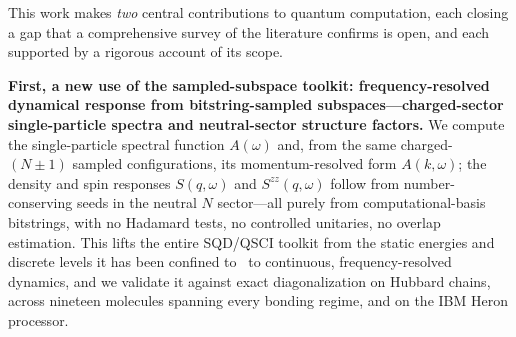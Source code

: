 This work makes \emph{two} central contributions to quantum computation, each closing a gap that a
comprehensive survey of the literature confirms is open, and each supported by a rigorous account of
its scope.

\textbf{First, a new use of the sampled-subspace toolkit: frequency-resolved dynamical response
from bitstring-sampled subspaces---charged-sector single-particle spectra and neutral-sector structure factors.} We compute the single-particle spectral function $A(\omega)$ and, from the same
charged-$(N{\pm}1)$ sampled configurations, its momentum-resolved form $A(k,\omega)$; the density and
spin responses $S(q,\omega)$ and $S^{zz}(q,\omega)$ follow from number-conserving seeds in the neutral
$N$ sector---all purely from computational-basis bitstrings, with no Hadamard tests, no controlled unitaries, no
overlap estimation. This lifts the entire SQD/QSCI toolkit from the static energies and discrete
levels it has been confined to~\cite{robledomoreno2025,kanno2023,extsqd2025,ohgoe2025} to
continuous, frequency-resolved dynamics, and we validate it against exact diagonalization on Hubbard
chains, across nineteen molecules spanning every bonding regime, and on the IBM Heron
processor.

